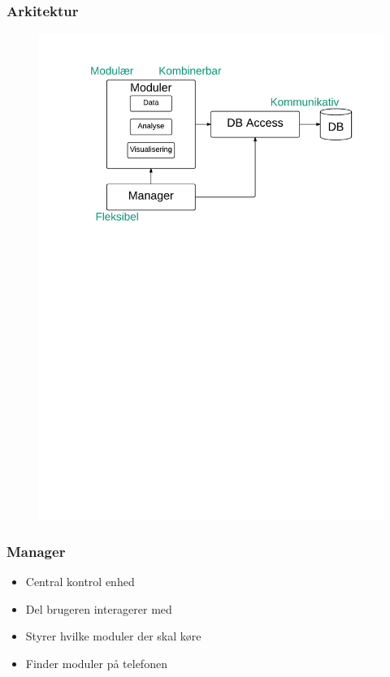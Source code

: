 \begin{frame}
\frametitle{Arkitektur}
\begin{figure}[h]
	\centering						%
	\includegraphics[scale=0.5, trim = 1cm 17.5cm 1cm 1cm, clip]{../graphics/ArkitekturMedKriterier}
\end{figure}
\end{frame}

\begin{frame}
\frametitle{Manager}
\begin{itemize}
\item Central kontrol enhed
\item Del brugeren interagerer med
\item Styrer hvilke moduler der skal køre
\item Finder moduler på telefonen
\end{itemize}
\end{frame}

